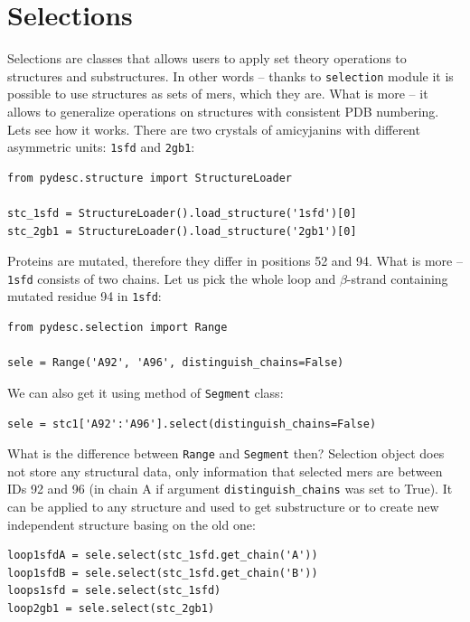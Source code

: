 \documentclass{article}
\begin{document}

\section{Selections} \label{SELEsec}

Selections are classes that allows users to apply set theory operations to structures and substructures. In other words -- thanks to \texttt{selection} module it is possible to use structures as sets of mers, which they are. What is more -- it allows to generalize operations on structures with consistent PDB numbering. Lets see how it works. There are two crystals of amicyjanins with different asymmetric units: \texttt{1sfd} and \texttt{2gb1}:

\begin{lstlisting}
from pydesc.structure import StructureLoader

stc_1sfd = StructureLoader().load_structure('1sfd')[0]
stc_2gb1 = StructureLoader().load_structure('2gb1')[0]
\end{lstlisting}

Proteins are mutated, therefore they differ in positions 52 and 94. What is more -- \texttt{1sfd} consists of two chains. Let us pick the whole loop and $\beta$-strand containing mutated residue 94 in \texttt{1sfd}:

\begin{lstlisting}
from pydesc.selection import Range

sele = Range('A92', 'A96', distinguish_chains=False)
\end{lstlisting}

We can also get it using method of \texttt{Segment} class:

\begin{lstlisting}
sele = stc1['A92':'A96'].select(distinguish_chains=False)
\end{lstlisting}

What is the difference between \texttt{Range} and \texttt{Segment} then? Selection object does not store any structural data, only information that selected mers are between IDs 92 and 96 (in chain A if argument \texttt{distinguish\_{}chains} was set to True). It can be applied to any structure and used to get substructure or to create new independent structure basing on the old one:

\begin{lstlisting}
loop1sfdA = sele.select(stc_1sfd.get_chain('A'))
loop1sfdB = sele.select(stc_1sfd.get_chain('B'))
loops1sfd = sele.select(stc_1sfd)
loop2gb1 = sele.select(stc_2gb1)
\end{lstlisting}
\end{document}
